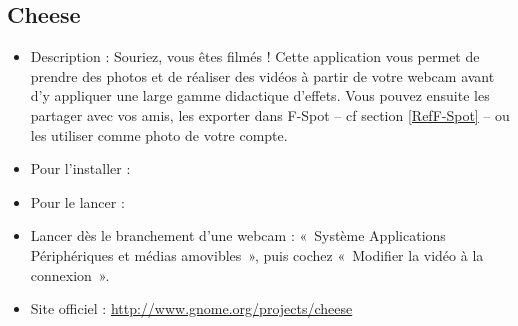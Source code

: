 \subsection{Cheese}
\begin{itemize}
\begingroup
{}
\item Description : Souriez, vous êtes filmés ! Cette application vous permet de prendre des photos et de réaliser des vidéos à partir de votre webcam avant d'y appliquer une large gamme didactique d'effets. Vous pouvez ensuite les partager avec vos amis, les exporter dans F-Spot -- cf section \ref{RefF-Spot} -- ou les utiliser comme photo de votre compte.{\par}
\item Pour l'installer : 
\item Pour le lancer : 
\item Lancer dès le branchement d'une webcam : «~Système \FlecheDroite Applications \FlecheDroite  Périphériques et médias amovibles~», puis cochez «~Modifier la vidéo à la connexion~».{\par}
\item Site officiel : \url{http://www.gnome.org/projects/cheese}{\par}
\endgroup
\end{itemize}
